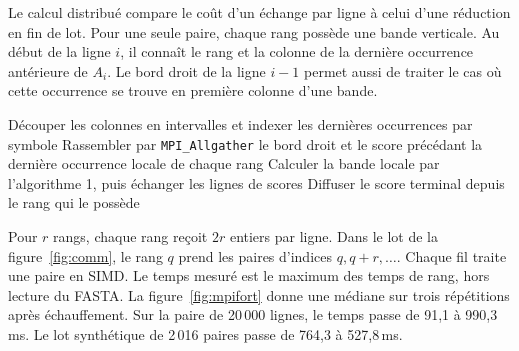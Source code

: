 Le calcul distribué compare le coût d'un échange par ligne à celui d'une réduction en fin de lot. Pour une seule paire, chaque rang possède une bande verticale. Au début de la ligne \(i\), il connaît le rang et la colonne de la dernière occurrence antérieure de \(A_i\). Le bord droit de la ligne \(i-1\) permet aussi de traiter le cas où cette occurrence se trouve en première colonne d'une bande.
\begin{algorithmic}[1]
\State Découper les colonnes en intervalles et indexer les dernières occurrences par symbole
\State Rassembler par \texttt{MPI\_Allgather} le bord droit et le score précédant la dernière occurrence locale de chaque rang
\State Calculer la bande locale par l'algorithme 1, puis échanger les lignes de scores
\EndFor
\State Diffuser le score terminal depuis le rang qui le possède
\end{algorithmic}
Pour \(r\) rangs, chaque rang reçoit \(2r\) entiers par ligne. Dans le lot de la figure~\ref{fig:comm}, le rang \(q\) prend les paires d'indices \(q,q+r,\ldots\). Chaque fil traite une paire en SIMD. Le temps mesuré est le maximum des temps de rang, hors lecture du FASTA.
La figure~\ref{fig:mpifort} donne une médiane sur trois répétitions après échauffement. Sur la paire de 20\,000 lignes, le temps passe de 91,1 à 990,3\,ms. Le lot synthétique de 2\,016 paires passe de 764,3 à 527,8\,ms.

